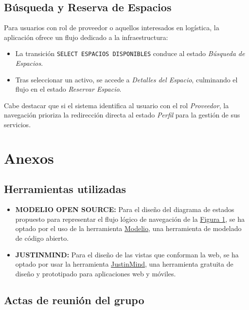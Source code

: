 \documentclass[12pt,a4paper]{article}
\begin{document}
\subsection{Búsqueda y Reserva de Espacios}
Para usuarios con rol de proveedor o aquellos interesados en logística, la aplicación ofrece un flujo dedicado a la infraestructura:
\begin{itemize}
    \item La transición \texttt{SELECT ESPACIOS DISPONIBLES} conduce al estado \textit{Búsqueda de Espacios}.
    \item Tras seleccionar un activo, se accede a \textit{Detalles del Espacio}, culminando el flujo en el estado \textit{Reservar Espacio}.
\end{itemize}
Cabe destacar que si el sistema identifica al usuario con el rol \textit{Proveedor}, la navegación prioriza la redirección directa al estado \textit{Perfil} para la gestión de sus servicios.



\section{Anexos}

\subsection{Herramientas utilizadas}
\begin{itemize}
    \item \textbf{MODELIO OPEN SOURCE: }Para el diseño del diagrama de estados propuesto para representar el flujo lógico de navegación de la \hyperref[fig1:arbol_nav]{Figura 1}, se ha optado por el uso de la herramienta \href{https://www.modelio.org/index.htm}{Modelio}, una herramienta de modelado de código abierto.
    \item \textbf{JUSTINMIND: }Para el diseño de las vistas que conforman la web, se ha optado por usar la herramienta \href{https://www.justinmind.com/es}{JustinMind}, una herramienta gratuita de diseño y prototipado para aplicaciones web y móviles.
\end{itemize}

\subsection{Actas de reunión del grupo}
\end{document}
